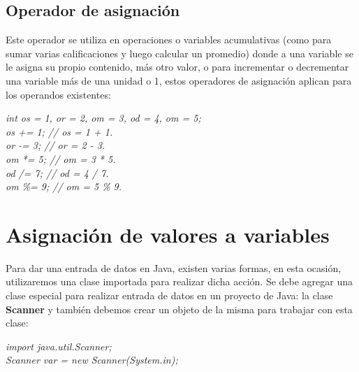 \subsection{Operador de asignación}
\hspace{0.55cm}Este operador se utiliza en operaciones o variables acumulativas (como para sumar varias calificaciones y luego calcular un promedio) donde a una variable se le asigna su propio contenido, más otro valor, o para incrementar o decrementar una variable más de una unidad o 1, estos operadores de asignación aplican para los operandos existentes:
\begin{center}
    \textit{
        int os = 1, or = 2, om = 3, od = 4, om = 5; \\
        os += 1; // os = 1 + 1. \\
        or -= 3; // or = 2 - 3. \\
        om *= 5; // om = 3 * 5. \\
        od /= 7; // od = 4 / 7. \\
        om \%= 9; // om = 5 \% 9.
    }
\end{center}



\section{Asignación de valores a variables}
\hspace{0.55cm}Para dar una entrada de datos en Java, existen varias formas, en esta ocasión, utilizaremos una clase importada para realizar dicha acción. Se debe agregar una clase especial para realizar entrada de datos en un proyecto de Java: la clase \textbf{Scanner} y también debemos crear un objeto de la misma para trabajar con esta clase:
\begin{center}
    \textit{
        import java.util.Scanner; \\
        Scanner var = new Scanner(System.in);
    }
\end{center}

